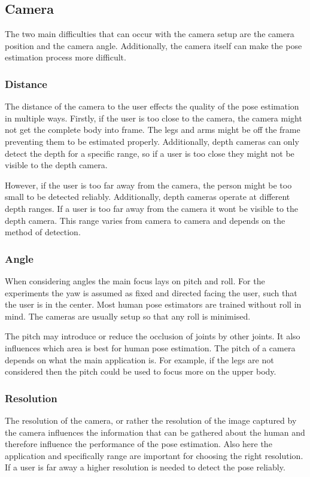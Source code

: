 \subsection{Camera}
\label{sec:camera}

The two main difficulties that can occur with the camera setup are the camera position and the camera angle. Additionally, the camera itself can make the pose estimation process more difficult. 

\subsubsection{Distance}

The distance of the camera to the user effects the quality of the pose estimation in multiple ways. Firstly, if the user is too close to the camera, the camera might not get the complete body into frame. The legs and arms might be off the frame preventing them to be estimated properly. Additionally, depth cameras can only detect the depth for a specific range, so if a user is too close they might not be visible to the depth camera.

However, if the user is too far away from the camera, the person might be too small to be detected reliably. Additionally, depth cameras operate at different depth ranges. If a user is too far away from the camera it wont be visible to the depth camera. This range varies from camera to camera and depends on the method of detection.

\subsubsection{Angle}

When considering angles the main focus lays on pitch and roll. For the experiments the yaw is assumed as fixed and directed facing the user, such that the user is in the center. Most human pose estimators are trained without roll in mind. The cameras are usually setup so that any roll is minimised.

The pitch may introduce or reduce the occlusion of joints by other joints. It also influences which area is best for human pose estimation. The pitch of a camera depends on what the main application is. For example, if the legs are not considered then the pitch could be used to focus more on the upper body.

\subsubsection{Resolution}

The resolution of the camera, or rather the resolution of the image captured by the camera influences the information that can be gathered about the human and therefore influence the performance of the pose estimation. Also here the application and specifically range are important for choosing the right resolution. If a user is far away a higher resolution is needed to detect the pose reliably.
